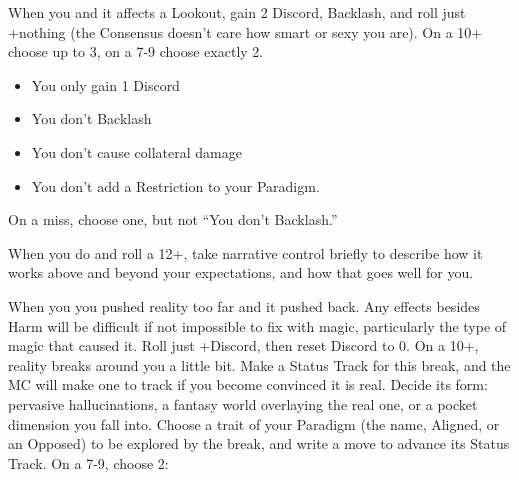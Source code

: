 \begin{multicols}{3}
  \SEPARATOR

  \begin{move}
    When you  and it affects a Lookout, gain 2 Discord, Backlash, and roll just +nothing (the Consensus doesn’t care how smart or sexy you are). On a 10+ choose up to 3, on a 7-9 choose exactly 2. 

    \begin{itemize}
      \setlength\itemsep{0em}
    \item You only gain 1 Discord
    \item You don’t Backlash
    \item You don’t cause collateral damage
    \item You don’t add a Restriction to your Paradigm. 
    \end{itemize}
On a miss, choose one, but not “You don’t Backlash.”

  \end{move}

  \SEPARATOR

  \begin{move}
    When you do  and roll a 12+, take narrative control briefly to describe how it works above and beyond your expectations, and how that goes well for you.

  \end{move}

  \columnbreak
  

  \SEPARATOR

  \begin{move}
    When you  you pushed reality too far and it pushed back. Any effects besides Harm will be difficult if not impossible to fix with magic, particularly the type of magic that caused it. Roll just +Discord, then reset Discord to 0. On a 10+, reality breaks around you a little bit. Make a Status Track for this break, and the MC will make one to track if you become convinced it is real. Decide its form: pervasive hallucinations, a fantasy world overlaying the real one, or a pocket dimension you fall into. Choose a trait of your Paradigm (the name, Aligned, or an Opposed) to be explored by the break, and write a move to advance its Status Track. 
On a 7-9, choose 2:


\end{move}
\end{multicols}
